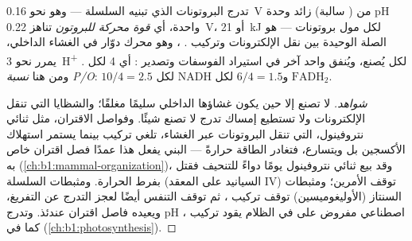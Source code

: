 \begin{theorem}\label{thm:b1:respiration-fermentation:chemiosmosis}
تدرج البروتونات الذي تبنيه السلسلة --- وهو نحو \qty{0.16}{V} من  ( سالبة) زائد وحدة pH واحدة، أي \emph{قوة محركة
للبروتون} تناهز \qty{0.22}{V}، أو \qty{21}{kJ} لكل مول بروتونات ---
هو الصلة الوحيدة بين نقل الإلكترونات وتركيب . ، وهو محرك
دوّار في الغشاء الداخلي، يمرر نحو \qty{3}{H^+} لكل  يُصنع، ويُنفق
واحد آخر في استيراد الفوسفات وتصدير : أي 4 لكل . ومن هنا
\emph{نسبة P/O}: $10/4 = 2.5$  لكل NADH
و$6/4 = 1.5$ لكل $\mathrm{FADH_2}$.
\end{theorem}
\begin{proof}[شواهد]
لا تصنع   إلا حين يكون غشاؤها الداخلي سليمًا مغلقًا؛
والشظايا التي تنقل الإلكترونات ولا تستطيع إمساك تدرج لا تصنع شيئًا.
وفواصل الاقتران، مثل ثنائي نتروفينول، التي تنقل البروتونات عبر
الغشاء، تلغي تركيب  بينما يستمر استهلاك الأكسجين بل ويتسارع،
فتغادر الطاقة حرارةً ---  البني يفعل هذا عمدًا  فصل
اقتران خاص به (\cref{ch:b1:mammal-organization})، وقد بيع ثنائي
نتروفينول يومًا دواءً للتنحيف فقتل بفرط الحرارة. ومثبطات السلسلة
(السيانيد على المعقد IV) توقف الأمرين؛ ومثبطات السنتاز (الأوليغوميسين)
توقف تركيب ، ثم توقف التنفس أيضًا لعجز التدرج عن التفريغ، ويعيده
فاصل اقتران عندئذ. وتدرج pH اصطناعي مفروض على  في الظلام يقود
تركيب ، كما في  (\cref{ch:b1:photosynthesis}).
\end{proof}

